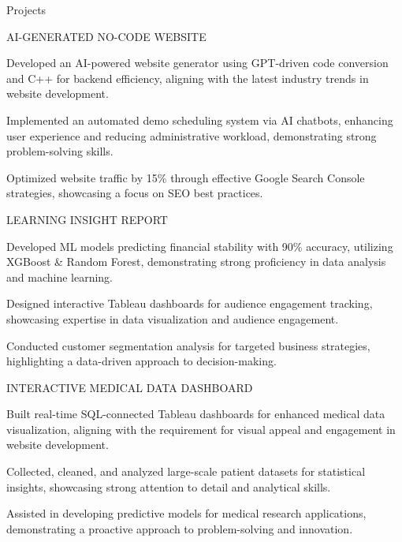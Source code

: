 \documentclass{resume} %
\begin{document}
    \begin{rSection}{Projects}
                    \begin{rSubsection}
                                    {AI{-}GENERATED NO{-}CODE WEBSITE}
                                {}{}{}
                                    \item Developed an AI{-}powered website generator using GPT{-}driven code conversion and C++ for backend efficiency, aligning with the latest industry trends in website development.
                                    \item Implemented an automated demo scheduling system via AI chatbots, enhancing user experience and reducing administrative workload, demonstrating strong problem{-}solving skills.
                                    \item Optimized website traffic by 15\% through effective Google Search Console strategies, showcasing a focus on SEO best practices.
                            \end{rSubsection}
                    \begin{rSubsection}
                                    {LEARNING INSIGHT REPORT}
                                {}{}{}
                                    \item Developed ML models predicting financial stability with 90\% accuracy, utilizing XGBoost \& Random Forest, demonstrating strong proficiency in data analysis and machine learning.
                                    \item Designed interactive Tableau dashboards for audience engagement tracking, showcasing expertise in data visualization and audience engagement.
                                    \item Conducted customer segmentation analysis for targeted business strategies, highlighting a data{-}driven approach to decision{-}making.
                            \end{rSubsection}
                    \begin{rSubsection}
                                    {INTERACTIVE MEDICAL DATA DASHBOARD}
                                {}{}{}
                                    \item Built real{-}time SQL{-}connected Tableau dashboards for enhanced medical data visualization, aligning with the requirement for visual appeal and engagement in website development.
                                    \item Collected, cleaned, and analyzed large{-}scale patient datasets for statistical insights, showcasing strong attention to detail and analytical skills.
                                    \item Assisted in developing predictive models for medical research applications, demonstrating a proactive approach to problem{-}solving and innovation.
                            \end{rSubsection}
            \end{rSection}
\end{document}
